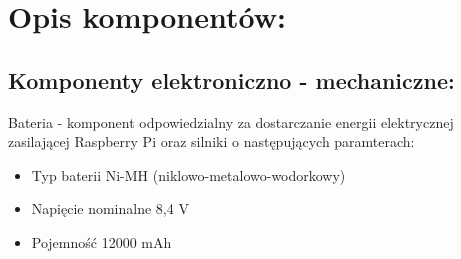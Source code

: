 \documentclass[a4paper]{article}
\begin{document}
\section{Opis komponentów:}

\subsection{Komponenty elektroniczno - mechaniczne:}


Bateria - komponent odpowiedzialny za dostarczanie energii elektrycznej zasilającej Raspberry Pi oraz silniki o następujących paramterach:
\begin{itemize}
\item Typ baterii Ni-MH (niklowo-metalowo-wodorkowy)
\item Napięcie nominalne 8,4 V
\item Pojemność 12000 mAh
\end{itemize}
\end{document}

